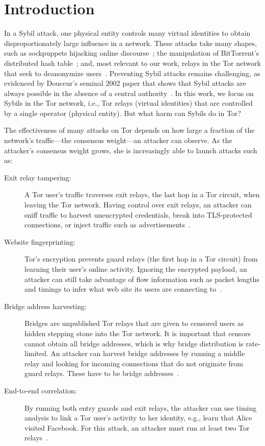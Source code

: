 \section{Introduction}
\label{sec:introduction}

In a Sybil attack, one physical entity controls many virtual identities to
obtain disproportionately large influence in a network.  These attacks take many
shapes, such as sockpuppets hijacking online discourse~\cite{Thomas2012a}; the
manipulation of BitTorrent's distributed hash table~\cite{Wang2012a}; and, most
relevant to our work, relays in the Tor network that seek to deanonymize
users~\cite{cmucert}.  Preventing Sybil attacks remains challenging, as
evidenced by Douceur's seminal 2002 paper that shows that Sybil attacks are
always possible in the absence of a central authority~\cite{Douceur2002a}.  In
this work, we focus on Sybils in the Tor network, i.e., Tor relays (virtual
identities) that are controlled by a single operator (physical entity).  But
what harm can Sybils do in Tor?

The effectiveness of many attacks on Tor depends on how large a fraction of the
network's traffic---the consensus weight---an attacker can observe.  As the
attacker's consensus weight grows, she is increasingly able to launch attacks
such as:
\begin{description}
	\item[Exit relay tampering:] A Tor user's traffic traverses exit relays, the
		last hop in a Tor circuit, when leaving the Tor network.  Having control
		over exit relays, an attacker can sniff traffic to harvest unencrypted
		credentials, break into TLS-protected connections, or inject traffic
		such as advertisements~\cite{Winter2014a}.
	\item[Website fingerprinting:] Tor's encryption prevents guard relays (the
		first hop in a Tor circuit) from learning their user's online activity.
		Ignoring the encrypted payload, an attacker can still take advantage of
		flow information such as packet lengths and timings to infer what web
		site its users are connecting to~\cite{Juarez2014a}.
	\item[Bridge address harvesting:] Bridges are unpublished Tor relays that
		are given to censored users as hidden stepping stone into the Tor
		network.  It is important that censors cannot obtain all bridge
		addresses, which is why bridge distribution is rate-limited.  An
		attacker can harvest bridge addresses by running a middle relay and
		looking for incoming connections that do not originate from guard
		relays.  These have to be bridge addresses~\cite{Ling2012a}.
	\item[End-to-end correlation:] By running both entry guards and exit relays,
		the attacker can use timing analysis to link a Tor user's activity to
		her identity, e.g., learn that Alice visited Facebook.  For this attack,
		an attacker must run at least two Tor relays~\cite{Johnson2013a}.
\end{description}

